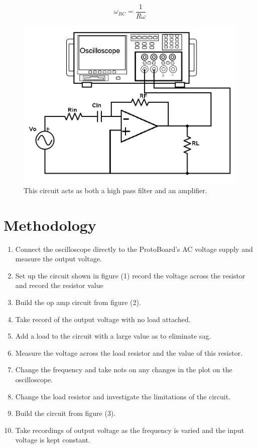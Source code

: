 \documentclass[twocolumn, amsmath]{revtex4}
\begin{document}
\begin{equation}
\omega_{RC} =  \frac{1}{R\omega}
\end{equation}


\begin{figure}[h]
    \includegraphics[scale=0.3]{highpassamp.png}  
    \caption{This circuit acts as both a high pass filter and an amplifier.}
\end{figure}


\section{Methodology}

\begin{enumerate}
    \item Connect the oscilloscope directly to the ProtoBoard's AC voltage supply and measure the output voltage.
    \item Set up the circuit shown in figure (1) record the voltage across the resistor and record the resistor value
    \item Build the op amp circuit from figure (2).
    \item Take record of the output voltage with no load attached.
    \item Add a load to the circuit with a large value as to eliminate sag.
    \item Measure the voltage across the load resistor and the value of this resistor.
    \item Change the frequency and take nots on any changes in the plot on the oscilloscope.
    \item Change the load resistor and investigate the limitations of the circuit.
    \item Build the circuit from figure (3).
    \item Take recordings of output voltage as the frequency is varied and the input voltage is kept constant.
\end{enumerate}
\end{document}

